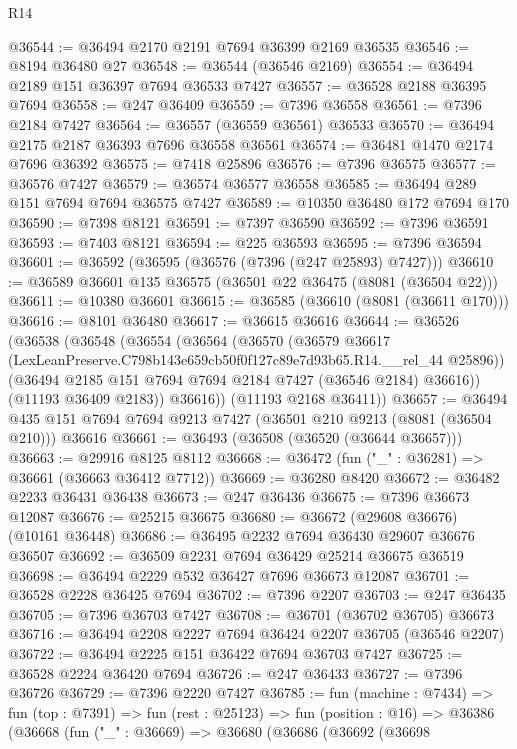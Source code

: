 \begin{lexlean}{R14}
\begin{coremodule}
@36544 := @36494 @2170 @2191 @7694 @36399 @2169 @36535
@36546 := @8194 @36480 @27
@36548 := @36544 (@36546 @2169)
@36554 := @36494 @2189 @151 @36397 @7694 @36533 @7427
@36557 := @36528 @2188 @36395 @7694
@36558 := @247 @36409
@36559 := @7396 @36558
@36561 := @7396 @2184 @7427
@36564 := @36557 (@36559 @36561) @36533
@36570 := @36494 @2175 @2187 @36393 @7696 @36558 @36561
@36574 := @36481 @1470 @2174 @7696 @36392
@36575 := @7418 @25896
@36576 := @7396 @36575
@36577 := @36576 @7427
@36579 := @36574 @36577 @36558
@36585 := @36494 @289 @151 @7694 @7694 @36575 @7427
@36589 := @10350 @36480 @172 @7694 @170
@36590 := @7398 @8121
@36591 := @7397 @36590
@36592 := @7396 @36591
@36593 := @7403 @8121
@36594 := @225 @36593
@36595 := @7396 @36594
@36601 := @36592 (@36595 (@36576 (@7396 (@247 @25893) @7427)))
@36610 := @36589 @36601 @135 @36575 (@36501 @22 @36475 (@8081 (@36504 @22)))
@36611 := @10380 @36601
@36615 := @36585 (@36610 (@8081 (@36611 @170)))
@36616 := @8101 @36480
@36617 := @36615 @36616
@36644 := @36526
    (@36538
      (@36548
        (@36554
          (@36564
            (@36570
              (@36579
                @36617
                (LexLeanPreserve.C798b143e659cb50f0f127c89e7d93b65.R14.__rel_44 @25896))
              (@36494 @2185 @151 @7694 @7694 @2184 @7427 (@36546 @2184) @36616))
            (@11193 @36409 @2183))
          @36616))
      (@11193 @2168 @36411))
@36657 := @36494 @435 @151 @7694 @7694 @9213 @7427 (@36501 @210 @9213 (@8081 (@36504 @210))) @36616
@36661 := @36493 (@36508 (@36520 (@36644 @36657)))
@36663 := @29916 @8125 @8112
@36668 := @36472 (fun ("_" : @36281) => @36661 (@36663 @36412 @7712))
@36669 := @36280 @8420
@36672 := @36482 @2233 @36431 @36438
@36673 := @247 @36436
@36675 := @7396 @36673 @12087
@36676 := @25215 @36675
@36680 := @36672 (@29608 @36676) (@10161 @36448)
@36686 := @36495 @2232 @7694 @36430 @29607 @36676 @36507
@36692 := @36509 @2231 @7694 @36429 @25214 @36675 @36519
@36698 := @36494 @2229 @532 @36427 @7696 @36673 @12087
@36701 := @36528 @2228 @36425 @7694
@36702 := @7396 @2207
@36703 := @247 @36435
@36705 := @7396 @36703 @7427
@36708 := @36701 (@36702 @36705) @36673
@36716 := @36494 @2208 @2227 @7694 @36424 @2207 @36705 (@36546 @2207)
@36722 := @36494 @2225 @151 @36422 @7694 @36703 @7427
@36725 := @36528 @2224 @36420 @7694
@36726 := @247 @36433
@36727 := @7396 @36726
@36729 := @7396 @2220 @7427
@36785 := fun (machine : @7434) =>
  fun (top : @7391) =>
  fun (rest : @25123) =>
  fun (position : @16) =>
  @36386
    (@36668
      (fun ("_" : @36669) =>
      @36680
        (@36686
          (@36692
            (@36698

\end{coremodule}
\end{lexlean}
